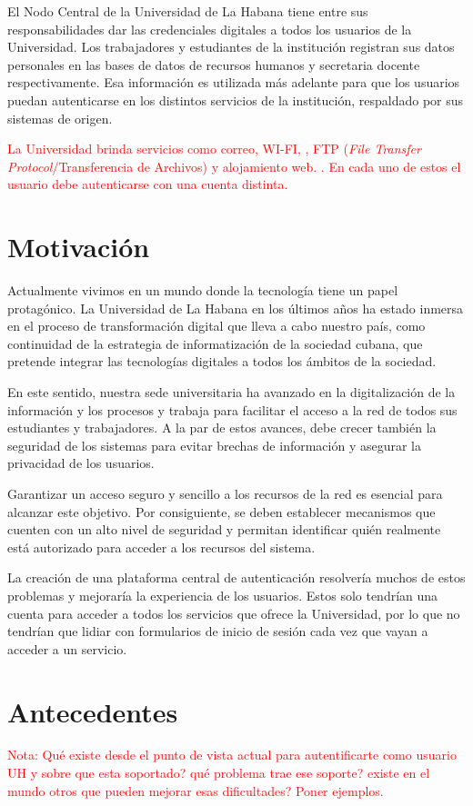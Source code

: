El Nodo Central de la Universidad de La Habana tiene entre sus responsabilidades dar las credenciales digitales a todos los usuarios de la Universidad. Los trabajadores y estudiantes de la institución registran sus datos personales en las bases de datos de recursos humanos y secretaria docente respectivamente. Esa información es utilizada más adelante para que los usuarios puedan autenticarse en los distintos servicios de la institución, respaldado por sus sistemas de origen.

\textcolor{red}{La Universidad brinda servicios como correo, WI-FI, , FTP (\textit{File Transfer Protocol}/Transferencia de Archivos) y alojamiento web. . En cada uno de estos el usuario debe autenticarse con una cuenta distinta.}

\section*{Motivación}
Actualmente vivimos en un mundo donde la tecnología tiene un papel protagónico. La Universidad de La Habana en los últimos años ha estado inmersa en el proceso de transformación digital que lleva a cabo nuestro país, como continuidad de la estrategia de informatización de la sociedad cubana, que pretende integrar las tecnologías digitales a todos los ámbitos de la sociedad.

En este sentido, nuestra sede universitaria ha avanzado en la digitalización de la información y los procesos y trabaja para facilitar el acceso a la red de todos sus estudiantes y trabajadores. A la par de estos avances, debe crecer también la seguridad de los sistemas para evitar brechas de información y asegurar la privacidad de los usuarios.

Garantizar un acceso seguro y sencillo a los recursos de la red es esencial para alcanzar este objetivo. Por consiguiente, se deben establecer mecanismos que cuenten con un alto nivel de seguridad y permitan identificar quién realmente está autorizado para acceder a los recursos del sistema.

La creación de una plataforma central de autenticación resolvería muchos de estos problemas y mejoraría la experiencia de los usuarios. Estos solo tendrían una cuenta para acceder a todos los servicios que ofrece la Universidad, por lo que no tendrían que lidiar con formularios de inicio de sesión cada vez que vayan a acceder a un servicio.


\section*{Antecedentes}
\textcolor{red} {Nota: Qué existe desde el punto de vista actual para autentificarte como usuario UH y sobre que esta soportado? qué problema trae ese soporte? existe en el mundo otros que pueden mejorar esas dificultades? Poner ejemplos. }

